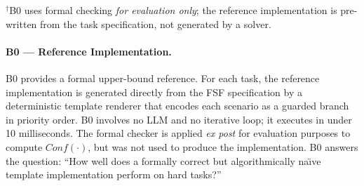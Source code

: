 \begin{table}[t]
  \caption{Compared methods and their component configurations.
           Formal = formal check; Guard = pattern guard; Repair = repair loop.}
  \label{tab:modes}
  \centering
  \par\smallskip
  \raggedright\footnotesize $^\dagger$B0 uses formal checking \emph{for evaluation only};
  the reference implementation is pre-written from the task specification, not
  generated by a solver.
\end{table}

\paragraph{B0 --- Reference Implementation.}
B0 provides a formal upper-bound reference.  For each task, the reference
implementation is generated directly from the FSF specification by a deterministic
template renderer that encodes each scenario as a guarded branch in priority order.
B0 involves no LLM and no iterative loop; it executes in under 10 milliseconds.
The formal checker is applied \emph{ex post} for evaluation purposes to compute
$\mathit{Conf}(\cdot)$, but was not used to produce the implementation.  B0 answers
the question: ``How well does a formally correct but algorithmically na\"{\i}ve
template implementation perform on hard tasks?''

